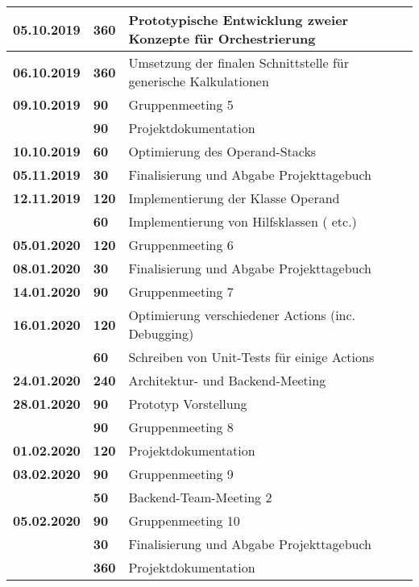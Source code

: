 {\begin{longtable}{|l|l|p{11cm}|}
		\\ \hline \textbf{05.10.2019}
			& \textbf{\hfill 360} & Prototypische Entwicklung zweier Konzepte für Orchestrierung
		\\ \hline \textbf{06.10.2019}
			& \textbf{\hfill 360} & Umsetzung der finalen Schnittstelle für generische Kalkulationen
		\\ \hline \textbf{09.10.2019}
			& \textbf{\hfill 90} & Gruppenmeeting 5 \\\cline{2-3}
			& \textbf{\hfill 90} & Projektdokumentation
		\\ \hline \textbf{10.10.2019}
			& \textbf{\hfill 60} & Optimierung des Operand-Stacks
		\\ \hline \textbf{05.11.2019}
			& \textbf{\hfill 30} & Finalisierung und Abgabe Projekttagebuch
		\\ \hline \textbf{12.11.2019}
		& \textbf{\hfill 120} & Implementierung der Klasse Operand \\\cline{2-3}
		& \textbf{\hfill 60} & Implementierung von Hilfsklassen (\code{DoubleComparator} etc.)
		\\ \hline \textbf{05.01.2020}
			& \textbf{\hfill 120} & Gruppenmeeting 6
		\\ \hline \textbf{08.01.2020}
			& \textbf{\hfill 30} & Finalisierung und Abgabe Projekttagebuch
		\\ \hline \textbf{14.01.2020}
			& \textbf{\hfill 90} & Gruppenmeeting 7
		\\ \hline \textbf{16.01.2020}
			& \textbf{\hfill 120} & Optimierung verschiedener Actions (inc. Debugging) \\\cline{2-3}
			& \textbf{\hfill 60} & Schreiben von Unit-Tests für einige Actions
		\\ \hline \textbf{24.01.2020}
			& \textbf{\hfill 240} & Architektur- und Backend-Meeting
		\\ \hline \textbf{28.01.2020}
			& \textbf{\hfill 90} & Prototyp Vorstellung \\\cline{2-3}
			& \textbf{\hfill 90} & Gruppenmeeting 8
		\\ \hline \textbf{01.02.2020}
			& \textbf{\hfill 120} & Projektdokumentation
		\\ \hline \textbf{03.02.2020}
			& \textbf{\hfill 90} & Gruppenmeeting 9 \\\cline{2-3}
			& \textbf{\hfill 50} & Backend-Team-Meeting 2
		\\ \hline \textbf{05.02.2020}
			& \textbf{\hfill 90} & Gruppenmeeting 10 \\\cline{2-3}
			& \textbf{\hfill 30} & Finalisierung und Abgabe Projekttagebuch \\\cline{2-3}
			& \textbf{\hfill 360} & Projektdokumentation \\
		\hline\hline
	\end{longtable}
}

